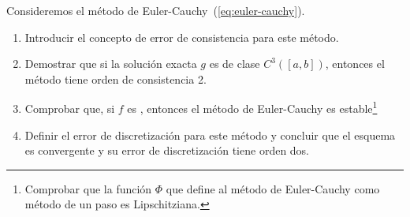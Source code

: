 \begin{EjerciciosPropuestos}
  \begin{problema}
    Consideremos el método de Euler-Cauchy~(\ref{eq:euler-cauchy}).
    \begin{enumerate}
    \item Introducir el concepto de error de consistencia para este método.
    \item Demostrar que si la solución exacta $g$ es de clase
      $C^3([a,b])$, entonces el método tiene orden de consistencia 2.
    \item Comprobar que, si $f$ es \globLipschitz, entonces el método
      de Euler-Cauchy es estable\footnote{Comprobar que la función
        $\Phi$ que define al método de Euler-Cauchy como método de un
        paso es Lipschitziana.}
    \item Definir el error de discretización para este método y
      concluir que el esquema es convergente y su error de
      discretización tiene orden dos.
    \end{enumerate}
  \end{problema}
\end{EjerciciosPropuestos}

